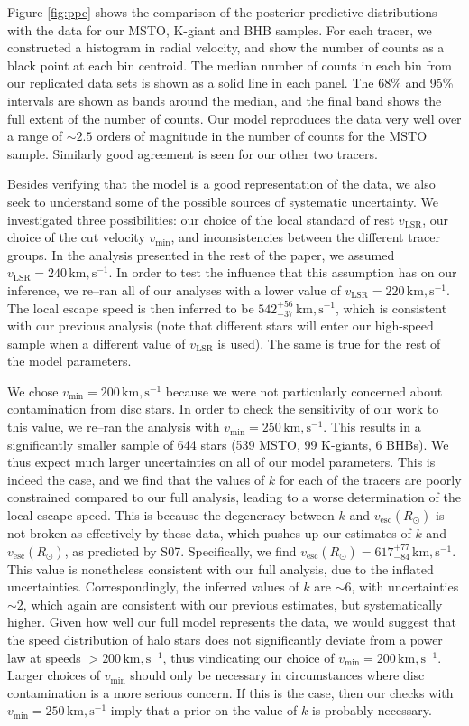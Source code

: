 \documentclass[useAMS,twocolumn,usenatbib]{mn2e}
\def\km,s{{\,\mathrm{km,s^{-1}}}}
\def\vesc{{v_\mathrm{esc}}}
\def\vmin{{v_\mathrm{min}}}
\begin{document}
Figure \ref{fig:ppc} shows the comparison of the posterior predictive distributions with the data for our MSTO, K-giant and BHB samples. 
For each tracer, we constructed a histogram in radial velocity, and show the number of counts as a black point at each bin centroid. 
The median number of counts in each bin from our replicated data sets is shown as a solid line in each panel.
The 68\% and 95\% intervals are shown as bands around the median, and the final band shows the full extent of the number of counts.  
Our model reproduces the data very well over a range of $\sim 2.5$ orders of magnitude in the number of counts for the MSTO sample. 
Similarly good agreement is seen for our other two tracers.

Besides verifying that the model is a good representation of the data, we also seek to understand some of the possible sources of systematic uncertainty.
We investigated three possibilities: our choice of the local standard of rest $v_\mathrm{LSR}$, our choice of the cut velocity $\vmin$, and inconsistencies between the different tracer groups.
In the analysis presented in the rest of the paper, we assumed $v_\mathrm{LSR} = 240\km,s$. 
In order to test the influence that this assumption has on our inference, we re--ran all of our analyses with a lower value of $v_\mathrm{LSR} = 220\km,s$.
The local escape speed is then inferred to be $542^{+56}_{-37}\km,s$, which is consistent with our previous analysis (note that different stars will enter our high-speed sample when a different value of $v_\mathrm{LSR}$ is used). 
The same is true for the rest of the model parameters.

We chose $\vmin=200\km,s$ because we were not particularly concerned about contamination from disc stars. 
In order to check the sensitivity of our work to this value, we re--ran the analysis with $\vmin = 250\km,s$. 
This results in a significantly smaller sample of 644 stars (539 MSTO, 99 K-giants, 6 BHBs). 
We thus expect much larger uncertainties on all of our model parameters. 
This is indeed the case, and we find that the values of $k$ for each of the tracers are poorly constrained compared to our full analysis, leading to a worse determination of the local escape speed. 
This is because the degeneracy between $k$ and $\vesc(R_\odot)$ is not broken as effectively by these data, which pushes up our estimates of $k$ and $\vesc(R_\odot)$, as predicted by S07. 
Specifically, we find $\vesc(R_\odot) = 617^{+77}_{-84}\km,s$.  
This value is nonetheless consistent with our full analysis, due to the inflated uncertainties. 
Correspondingly, the inferred values of $k$ are $\sim 6$, with uncertainties $\sim 2$, which again are consistent with our previous estimates, but systematically higher. 
Given how well our full model represents the data, we would suggest that the speed distribution of halo stars does not significantly deviate from a power law at speeds $>200\km,s$, thus vindicating our choice of $\vmin = 200\km,s$. 
Larger choices of $\vmin$ should only be necessary in circumstances where disc contamination is a more serious concern. 
If this is the case, then our checks with $\vmin = 250\km,s$ imply that a prior on the value of $k$ is probably necessary.
\end{document}
